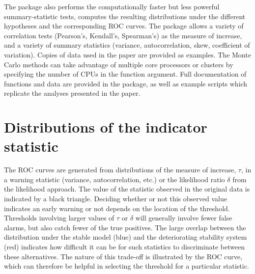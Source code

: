 \documentclass[11pt]{elsarticle}
\begin{document}
The package also performs the computationally faster but less powerful summary-statistic tests, computes the resulting distributions under the different hypotheses and the corresponding ROC curves.  The package allows a variety of correlation tests (Pearson's, Kendall's, Spearman's) as the measure of increase, and a variety of summary statistics (variance, autocorrelation, skew, coefficient of variation).  Copies of data used in the paper are provided as examples.  The Monte Carlo methods can take advantage of multiple core processors or clusters by specifying the number of CPUs in the function argument.   Full documentation of functions and data are provided in the package, as well as example scripts which replicate the analyses presented in the paper.   

 \section{Distributions of the indicator statistic}
The ROC curves are generated from distributions of the measure of increase, $\tau$, in a warning statistic (variance, autocorrelation, etc.) or the likelihood ratio $\delta$ from the likelihood approach.  The value of the statistic observed in the original data is indicated by a black triangle. Deciding whether or not this observed value indicates an early warning or not depends on the location of the threshold.  Thresholds involving larger values of $\tau$ or $\delta$ will generally involve fewer false alarms, but also catch fewer of the true positives.  The large overlap between the distribution under the stable model (blue) and the deteriorating stability system (red) indicates how difficult it can be for such statistics to discriminate between these alternatives.  The nature of this trade-off is illustrated by the ROC curve, which can therefore be helpful in selecting the threshold for a particular statistic.  
\end{document}
